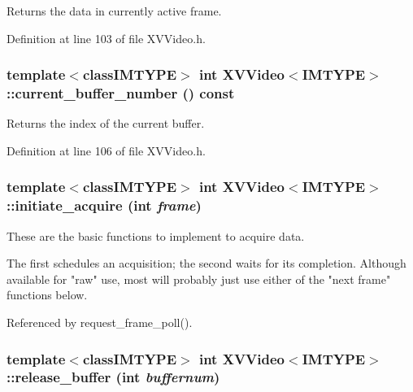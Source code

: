 Returns the data in currently active frame.



Definition at line 103 of file XVVideo.h.\label{XVVideo_a5}
\hypertarget{class_XVVideo_a5}{
\subsubsection[current_buffer_number]{\setlength{\rightskip}{0pt plus 5cm}template$<$classIMTYPE$>$ int XVVideo$<$IMTYPE$>$::current\_\-buffer\_\-number () const}}


Returns the index of the current buffer.



Definition at line 106 of file XVVideo.h.\label{XVVideo_a6}
\hypertarget{class_XVVideo_a6}{
\subsubsection[initiate_acquire]{\setlength{\rightskip}{0pt plus 5cm}template$<$classIMTYPE$>$ int XVVideo$<$IMTYPE$>$::initiate\_\-acquire (int {\em frame})}}


These are the basic functions to implement to acquire data.

The  first schedules an acquisition; the second waits for its completion. Although available for "raw" use, most will probably just use  either of the "next frame" functions below. 

Referenced by request\_\-frame\_\-poll().\label{XVVideo_a8}
\hypertarget{class_XVVideo_a8}{
\subsubsection[release_buffer]{\setlength{\rightskip}{0pt plus 5cm}template$<$classIMTYPE$>$ int XVVideo$<$IMTYPE$>$::release\_\-buffer (int {\em buffernum})}}




